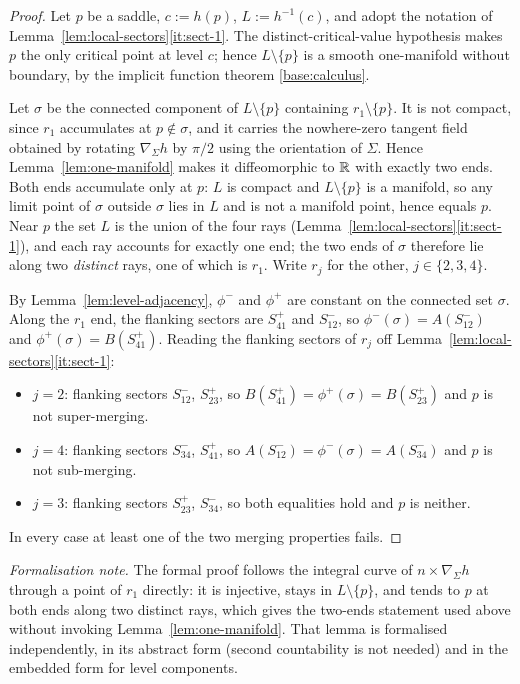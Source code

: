 \begin{proof}
Let $p$ be a saddle, $c:=h(p)$, $L:=h^{-1}(c)$, and adopt the notation of
Lemma~\ref{lem:local-sectors}\ref{it:sect-1}.  The distinct-critical-value
hypothesis makes $p$ the only critical point at level $c$; hence
$L\setminus\{p\}$ is a smooth one-manifold without boundary, by the
implicit function theorem \ref{base:calculus}.

Let $\sigma$ be the connected component of $L\setminus\{p\}$ containing
$r_1\setminus\{p\}$.  It is not compact, since $r_1$ accumulates at $p\notin\sigma$,
and it carries the nowhere-zero tangent field obtained by rotating
$\nabla_\Sigma h$ by $\pi/2$ using the orientation of $\Sigma$.  Hence
Lemma~\ref{lem:one-manifold} makes it diffeomorphic to $\mathbb R$ with exactly two
ends.  Both ends accumulate only at $p$: $L$ is compact and
$L\setminus\{p\}$ is a manifold, so any limit point of $\sigma$ outside
$\sigma$ lies in $L$ and is not a manifold point, hence equals $p$.  Near $p$
the set $L$ is the union of the four rays
(Lemma~\ref{lem:local-sectors}\ref{it:sect-1}), and each ray accounts for
exactly one end; the two ends of $\sigma$ therefore lie along two
\emph{distinct} rays, one of which is $r_1$.  Write $r_j$ for the other,
$j\in\{2,3,4\}$.

By Lemma~\ref{lem:level-adjacency}, $\phi^-$ and $\phi^+$ are constant on the
connected set $\sigma$.  Along the $r_1$ end, the flanking sectors are
$S^+_{41}$ and $S^-_{12}$, so
$\phi^-(\sigma)=A(S^-_{12})$ and $\phi^+(\sigma)=B(S^+_{41})$.  Reading the
flanking sectors of $r_j$ off Lemma~\ref{lem:local-sectors}\ref{it:sect-1}:
\begin{itemize}[nosep]
\item $j=2$: flanking sectors $S^-_{12}$, $S^+_{23}$, so
  $B(S^+_{41})=\phi^+(\sigma)=B(S^+_{23})$ and $p$ is not super-merging.
\item $j=4$: flanking sectors $S^-_{34}$, $S^+_{41}$, so
  $A(S^-_{12})=\phi^-(\sigma)=A(S^-_{34})$ and $p$ is not sub-merging.
\item $j=3$: flanking sectors $S^+_{23}$, $S^-_{34}$, so both equalities hold
  and $p$ is neither.
\end{itemize}
In every case at least one of the two merging properties fails.
\end{proof}

\medskip\noindent\emph{Formalisation note.} The formal proof follows the integral curve of $n\times\nabla_\Sigma h$ through a point of $r_1$ directly: it is injective, stays in $L\setminus\{p\}$, and tends to $p$ at both ends along two distinct rays, which gives the two-ends statement used above without invoking Lemma~\ref{lem:one-manifold}. That lemma is formalised independently, in its abstract form (second countability is not needed) and in the embedded form for level components.

